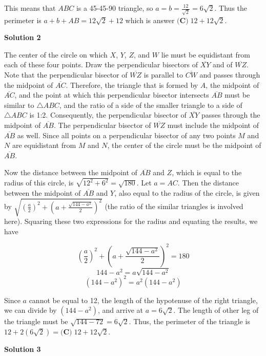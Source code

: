 \begin{enumerate}
 This means that $ABC$ is a 45-45-90 triangle, so $a = b = \frac{12}{\sqrt2} = 6\sqrt2$. Thus the perimeter is $a + b + AB = 12\sqrt2 + 12$ which is answer $\boxed{\textbf{(C)}\; 12 + 12\sqrt2}$.

 



\textbf{Solution 2}

The center of the circle on which $X$, $Y$, $Z$, and $W$ lie must be equidistant from each of these four points. Draw the perpendicular bisectors of $\overline{XY}$ and of $\overline{WZ}$. Note that the perpendicular bisector of $\overline{WZ}$ is parallel to $\overline{CW}$ and passes through the midpoint of $\overline{AC}$. Therefore, the triangle that is formed by $A$, the midpoint of $\overline{AC}$, and the point at which this perpendicular bisector intersects $\overline{AB}$ must be similar to $\triangle ABC$, and the ratio of a side of the smaller triangle to a side of $\triangle ABC$ is 1:2. Consequently, the perpendicular bisector of $\overline{XY}$ passes through the midpoint of $\overline{AB}$. The perpendicular bisector of $\overline{WZ}$ must include the midpoint of $\overline{AB}$ as well. Since all points on a perpendicular bisector of any two points $M$ and $N$ are equidistant from $M$ and $N$, the center of the circle must be the midpoint of $\overline{AB}$.

 Now the distance between the midpoint of $\overline{AB}$ and $Z$, which is equal to the radius of this circle, is $\sqrt{12^2 + 6^2} = \sqrt{180}$. Let $a=AC$. Then the distance between the midpoint of $\overline{AB}$ and $Y$, also equal to the radius of the circle, is given by $\sqrt{\left(\frac{a}{2}\right)^2 + \left(a + \frac{\sqrt{144 - a^2}}{2}\right)^2}$ (the ratio of the similar triangles is involved here). Squaring these two expressions for the radius and equating the results, we have

 
 \[\left(\frac{a}{2}\right)^2+\left(a+\frac{\sqrt{144-a^2}}{2}\right)^{2} = 180\]
 \[144 - a^2 = a\sqrt{144-a^2}\]
 \[(144-a^2)^2 = a^2(144-a^2)\]

 Since $a$ cannot be equal to 12, the length of the hypotenuse of the right triangle, we can divide by $(144-a^2)$, and arrive at $a = 6\sqrt{2}$. The length of other leg of the triangle must be $\sqrt{144-72} = 6\sqrt{2}$. Thus, the perimeter of the triangle is $12+2(6\sqrt{2}) = \boxed{\textbf{(C)}\; 12+12\sqrt{2}}$.

 



\textbf{Solution 3}


\end{enumerate}
